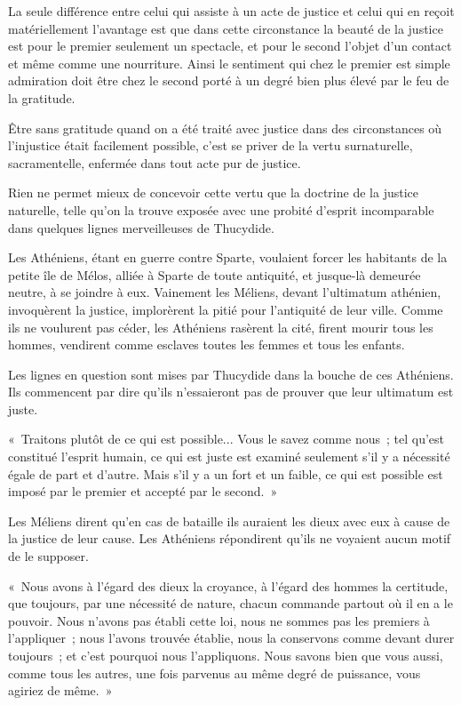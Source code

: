 \documentclass[french,twoside]{book} %
\begin{document}
La seule différence entre celui qui assiste à un acte de justice et celui qui en reçoit matériellement l'avantage est que dans cette circonstance la beauté de la justice est pour le premier seulement un spectacle, et pour le second l'objet d'un contact et même comme une nourriture. Ainsi le sentiment qui chez le premier est simple admiration doit être chez le second porté à un degré bien plus élevé par le feu de la gratitude.\par
Être sans gratitude quand on a été traité avec justice dans des circonstances où l'injustice était facilement possible, c'est se priver de la vertu surnaturelle, sacramentelle, enfermée dans tout acte pur de justice.\par
Rien ne permet mieux de concevoir cette vertu que la doctrine de la justice naturelle, telle qu'on la trouve exposée avec une probité d'esprit incomparable dans quelques lignes merveilleuses de Thucydide.\par
Les Athéniens, étant en guerre contre Sparte, voulaient forcer les habitants de la petite île de Mélos, alliée à Sparte de toute antiquité, et jusque-là demeurée neutre, à se joindre à eux. Vainement les Méliens, devant l'ultimatum athénien, invoquèrent la justice, implorèrent la pitié pour l'antiquité de leur ville. Comme ils ne voulurent pas céder, les Athéniens rasèrent la cité, firent mourir tous les hommes, vendirent comme esclaves toutes les femmes et tous les enfants.\par
Les lignes en question sont mises par Thucydide dans la bouche de ces Athéniens. Ils commencent par dire qu'ils n'essaieront pas de prouver que leur ultimatum est juste.\par
« Traitons plutôt de ce qui est possible... Vous le savez comme nous ; tel qu'est constitué l'esprit humain, ce qui est juste est examiné seulement s'il y a nécessité égale de part et d'autre. Mais s'il y a un fort et un faible, ce qui est possible est imposé par le premier et accepté par le second. »\par
Les Méliens dirent qu'en cas de bataille ils auraient les dieux avec eux à cause de la justice de leur cause. Les Athéniens répondirent qu'ils ne voyaient aucun motif de le supposer.\par
« Nous avons à l'égard des dieux la croyance, à l'égard des hommes la certitude, que toujours, par une nécessité de nature, chacun commande partout où il en a le pouvoir. Nous n'avons pas établi cette loi, nous ne sommes pas les premiers à l'appliquer ; nous l'avons trouvée établie, nous la conservons comme devant durer toujours ; et c'est pourquoi nous l'appliquons. Nous savons bien que vous aussi, comme tous les autres, une fois parvenus au même degré de puissance, vous agiriez de même. »\par
\end{document}
